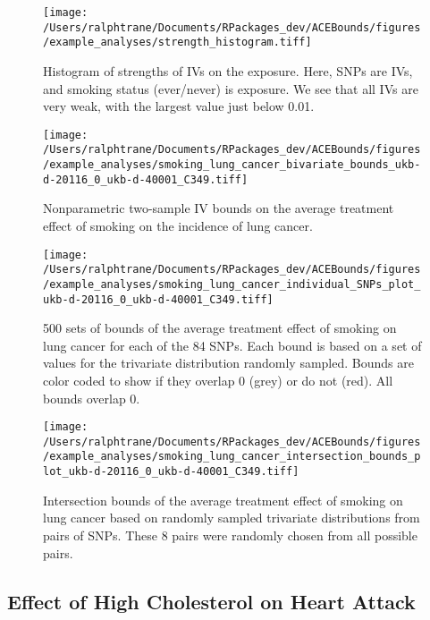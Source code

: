 \documentclass[AMA,STIX1COL,]{WileyNJD-v2}
\begin{document}
\begin{figure}[ht]
 \center
 \texttt{[image: /Users/ralphtrane/Documents/RPackages\_dev/ACEBounds/figures/example\_analyses/strength\_histogram.tiff]}
 \caption{Histogram of strengths of IVs on the exposure. Here, SNPs are IVs, and smoking status (ever/never) is exposure. We see that all IVs are very weak, with the largest value just below 0.01.}
 \label{fig:strength_histogram}
\end{figure}

\begin{figure}[ht]
  \center
  \texttt{[image: /Users/ralphtrane/Documents/RPackages\_dev/ACEBounds/figures/example\_analyses/smoking\_lung\_cancer\_bivariate\_bounds\_ukb-d-20116\_0\_ukb-d-40001\_C349.tiff]}
  \caption{Nonparametric two-sample IV bounds on the average treatment effect of smoking on the incidence of lung cancer.}
  \label{fig:smoking_on_lung_cancer_ind_bounds}
\end{figure}

\clearpage

\begin{sidewaysfigure}
  \center
  \texttt{[image: /Users/ralphtrane/Documents/RPackages\_dev/ACEBounds/figures/example\_analyses/smoking\_lung\_cancer\_individual\_SNPs\_plot\_ukb-d-20116\_0\_ukb-d-40001\_C349.tiff]}
  \caption{500 sets of bounds of the average treatment effect of smoking on lung cancer for each of the 84 SNPs. Each bound is based on a set of values for the trivariate distribution randomly sampled. Bounds are color coded to show if they overlap 0 (grey) or do not (red). All bounds overlap 0.}
  \label{fig:smoking_on_lung_cancer_tri_bounds_all}
\end{sidewaysfigure}

\clearpage

\begin{figure}[ht]
  \center
  \texttt{[image: /Users/ralphtrane/Documents/RPackages\_dev/ACEBounds/figures/example\_analyses/smoking\_lung\_cancer\_intersection\_bounds\_plot\_ukb-d-20116\_0\_ukb-d-40001\_C349.tiff]}
  \caption{Intersection bounds of the average treatment effect of smoking on lung cancer based on randomly sampled trivariate distributions from pairs of SNPs. These 8 pairs were randomly chosen from all possible pairs.}
  \label{fig:smoking_on_lung_cancer_intersections}
\end{figure}

\hypertarget{effect-of-high-cholesterol-on-heart-attack}{%
\subsection{\texorpdfstring{Effect of High Cholesterol on Heart Attack
\label{appendix:cholesterol-on-heart-attack}}{Effect of High Cholesterol on Heart Attack }}\label{effect-of-high-cholesterol-on-heart-attack}}
\end{document}

